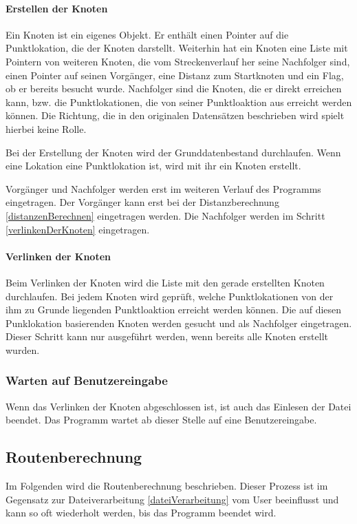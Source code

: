 \documentclass[12pt, a4paper, ngerman]{article}
\begin{document}
\paragraph{Erstellen der Knoten \label{knotenErstellen}}
Ein Knoten ist ein eigenes Objekt. Er enthält einen Pointer auf die Punktlokation, die der Knoten darstellt. Weiterhin hat ein Knoten eine Liste mit Pointern von weiteren Knoten, die vom Streckenverlauf her seine Nachfolger sind, einen Pointer auf seinen Vorgänger, eine Distanz zum Startknoten und ein Flag, ob er bereits besucht wurde. Nachfolger sind die Knoten, die er direkt erreichen kann, bzw. die Punktlokationen, die von seiner Punktloaktion aus erreicht werden können. Die Richtung, die in den originalen Datensätzen beschrieben wird spielt hierbei keine Rolle.

Bei der Erstellung der Knoten wird der Grunddatenbestand durchlaufen. Wenn eine Lokation eine Punktlokation ist, wird mit ihr ein Knoten erstellt. 


Vorgänger und Nachfolger werden erst im weiteren Verlauf des Programms eingetragen. Der Vorgänger kann erst bei der Distanzberechnung \ref{distanzenBerechnen} eingetragen werden. Die Nachfolger werden im Schritt \ref{verlinkenDerKnoten} eingetragen.

\paragraph{Verlinken der Knoten \label{verlinkenDerKnoten}} 
Beim Verlinken der Knoten wird die Liste mit den gerade erstellten Knoten durchlaufen. Bei jedem Knoten wird geprüft, welche Punktlokationen von der ihm zu Grunde liegenden Punktloaktion erreicht werden können. Die auf diesen Punklokation basierenden Knoten werden gesucht und als Nachfolger eingetragen. Dieser Schritt kann nur ausgeführt werden, wenn bereits alle Knoten erstellt wurden.

\subsubsection{Warten auf Benutzereingabe}
Wenn das Verlinken der Knoten abgeschlossen ist, ist auch das Einlesen der Datei beendet. Das Programm wartet ab dieser Stelle auf eine Benutzereingabe.

\subsection{Routenberechnung}
Im Folgenden wird die Routenberechnung beschrieben. Dieser Prozess ist im Gegensatz zur Dateiverarbeitung \ref{dateiVerarbeitung} vom User beeinflusst und kann so oft wiederholt werden, bis das Programm beendet wird.
\end{document}
